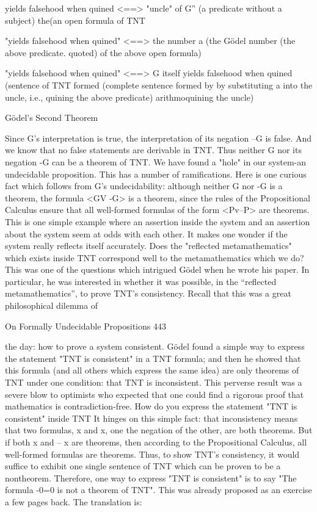 {   yields falsehood when quined         <==>                  "uncle" of G”
   (a predicate without a subject)                     the(an open formula of TNT

  "yields falsehood when quined"        <==>         the number a (the Gödel number
   (the above predicate. quoted)                        of the above open formula)

  "yields falsehood when quined"        <==>                    G itself
   yields falsehood when quined                        (sentence of TNT formed
   (complete sentence formed by                   by substituting a into the uncle, i.e.,
    quining the above predicate)                       arithmoquining the uncle)

                                Gödel’s Second Theorem

Since G's interpretation is true, the interpretation of its negation --G is false. And we
know that no false statements are derivable in TNT. Thus neither G nor its negation -G
can be a theorem of TNT. We have found a "hole" in our system-an undecidable
proposition. This has a number of ramifications. Here is one curious fact which follows
from G's undecidability: although neither G nor -G is a theorem, the formula <GV -G> is
a theorem, since the rules of the Propositional Calculus ensure that all well-formed
formulas of the form <Pv--P> are theorems.
This is one simple example where an assertion inside the system and an assertion about
the system seem at odds with each other. It makes one wonder if the system really
reflects itself accurately. Does the "reflected metamathematics" which exists inside TNT
correspond well to the metamathematics which we do? This was one of the questions
which intrigued Gödel when he wrote his paper. In particular, he was interested in
whether it was possible, in the “reflected metamathematics”, to prove TNT’s consistency.
Recall that this was a great philosophical dilemma of



On Formally Undecidable Propositions                                                  443

the day: how to prove a system consistent. Gödel found a simple way to express the
statement "TNT is consistent" in a TNT formula; and then he showed that this formula
(and all others which express the same idea) are only theorems of TNT under one
condition: that TNT is inconsistent. This perverse result was a severe blow to optimists
who expected that one could find a rigorous proof that mathematics is contradiction-free.
        How do you express the statement "TNT is consistent" inside TNT It hinges on
this simple fact: that inconsistency means that two formulas, x and x, one the negation of
the other, are both theorems. But if both x and -- x are theorems, then according to the
Propositional Calculus, all well-formed formulas are theorems. Thus, to show TNT's
consistency, it would suffice to exhibit one single sentence of TNT which can be proven
to be a nontheorem. Therefore, one way to express "TNT is consistent" is to say "The
formula -0=0 is not a theorem of TNT". This was already proposed as an exercise a few
pages back. The translation is:

}
